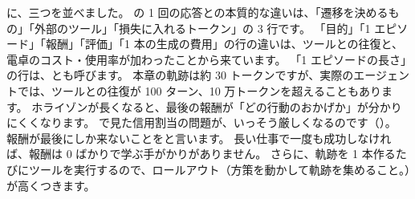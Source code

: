 に、三つを並べました。
の 1 回の応答との本質的な違いは、「遷移を決めるもの」「外部のツール」「損失に入れるトークン」の 3 行です。
「目的」「1 エピソード」「報酬」「評価」「1 本の生成の費用」の行の違いは、ツールとの往復と、電卓のコスト・使用率が加わったことから来ています。
「1 エピソードの長さ」の行は、とも呼びます。
本章の軌跡は約 30 トークンですが、実際のエージェントでは、ツールとの往復が 100 ターン、10 万トークンを超えることもあります。
ホライゾンが長くなると、最後の報酬が「どの行動のおかげか」が分かりにくくなります。
で見た信用割当の問題が、いっそう厳しくなるのです（）。
報酬が最後にしか来ないことをと言います。
長い仕事で一度も成功しなければ、報酬は 0 ばかりで学ぶ手がかりがありません。
さらに、軌跡を 1 本作るたびにツールを実行するので、ロールアウト（方策を動かして軌跡を集めること。）が高くつきます。

